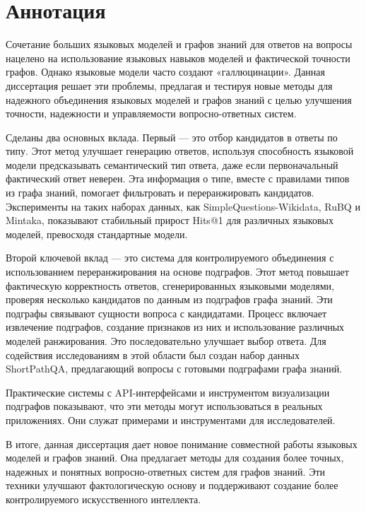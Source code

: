 \chapter*{Аннотация}
Сочетание больших языковых моделей и графов знаний для ответов на вопросы нацелено на использование языковых навыков моделей и фактической точности графов. Однако языковые модели часто создают «галлюцинации». Данная диссертация решает эти проблемы, предлагая и тестируя новые методы для надежного объединения языковых моделей и графов знаний с целью улучшения точности, надежности и управляемости вопросно-ответных систем.

Сделаны два основных вклада. Первый — это отбор кандидатов в ответы по типу. Этот метод улучшает генерацию ответов, используя способность языковой модели предсказывать семантический тип ответа, даже если первоначальный фактический ответ неверен. Эта информация о типе, вместе с правилами типов из графа знаний, помогает фильтровать и переранжировать кандидатов. Эксперименты на таких наборах данных, как SimpleQuestions-Wikidata, RuBQ и Mintaka, показывают стабильный прирост Hits@1 для различных языковых моделей, превосходя стандартные модели.

Второй ключевой вклад — это система для контролируемого объединения с использованием переранжирования на основе подграфов. Этот метод повышает фактическую корректность ответов, сгенерированных языковыми моделями, проверяя несколько кандидатов по данным из подграфов графа знаний. Эти подграфы связывают сущности вопроса с кандидатами. Процесс включает извлечение подграфов, создание признаков из них и использование различных моделей ранжирования. Это последовательно улучшает выбор ответа. Для содействия исследованиям в этой области был создан набор данных ShortPathQA, предлагающий вопросы с готовыми подграфами графа знаний.

Практические системы с API-интерфейсами и инструментом визуализации подграфов показывают, что эти методы могут использоваться в реальных приложениях. Они служат примерами и инструментами для исследователей.

В итоге, данная диссертация дает новое понимание совместной работы языковых моделей и графов знаний. Она предлагает методы для создания более точных, надежных и понятных вопросно-ответных систем для графов знаний. Эти техники улучшают фактологическую основу и поддерживают создание более контролируемого искусственного интеллекта.